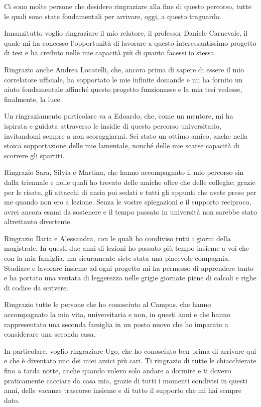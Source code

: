 Ci sono molte persone che desidero ringraziare alla fine di questo percorso, tutte le quali sono state fondamentali
per arrivare, oggi, a questo traguardo.

Innanzitutto voglio ringraziare il mio relatore, il professor Daniele Carnevale, il quale mi ha concesso l'opportunità di lavorare
a questo interessantissimo progetto di tesi e ha creduto nelle mie capacità più di quanto facessi io stessa.

Ringrazio anche Andrea Locatelli, che, ancora prima di sapere di essere il mio correlatore ufficiale,
ha sopportato le mie infinite domande e mi ha fornito un
aiuto fondamentale affinché questo progetto funzionasse e la mia tesi vedesse, finalmente, la luce. 

Un ringraziamento particolare va a Edoardo, che, come un mentore, mi ha ispirata e guidata attraverso le insidie di 
questo percorso universitario, invitandomi sempre a non scoraggiarmi. Sei stato un ottimo amico, anche nella stoica 
sopportazione delle mie lamentale, nonché delle mie scarse capacità di scorrere gli spartiti.

Ringrazio Sara, Silvia e Martina, che hanno accompagnato il mio percorso sin dalla triennale e nelle quali ho trovato delle
amiche oltre che delle colleghe; grazie per le risate, gli attacchi di ansia poi sedati e tutti gli appunti che avete preso per 
me quando non ero a lezione. Senza le vostre spiegazioni e il supporto reciproco, avrei ancora esami da sostenere e il tempo 
passato in università non sarebbe stato altrettanto divertente.

Ringrazio Ilaria e Alessandra, con le quali ho condiviso tutti i giorni della magistrale. In questi due anni di lezioni ho passato più 
tempo insieme a voi che con la mia famiglia, ma sicuramente siete stata una piacevole compagnia. Studiare e lavorare insieme ad ogni progetto
mi ha permesso di apprendere tanto e ha portato una ventata di leggerezza nelle grigie giornate piene di calcoli e righe di codice da scrivere.

Ringrazio tutte le persone che ho conosciuto al Campus, che hanno accompagnato la mia vita, universitaria e non, in questi anni e che hanno 
rappresentato una seconda famiglia in un posto nuovo che ho imparato a considerare una seconda casa.

In particolare, voglio ringraziare Ugo, che ho conosciuto ben prima di arrivare qui e che è diventato uno dei miei amici più cari.
Ti ringrazio di tutte le chiacchierate fino a tarda notte, anche quando volevo solo andare a dormire e ti dovevo praticamente cacciare da casa mia,
grazie di tutti i momenti condivisi in questi anni, delle vacanze trascorse insieme e di tutto il supporto che mi hai sempre dato.

